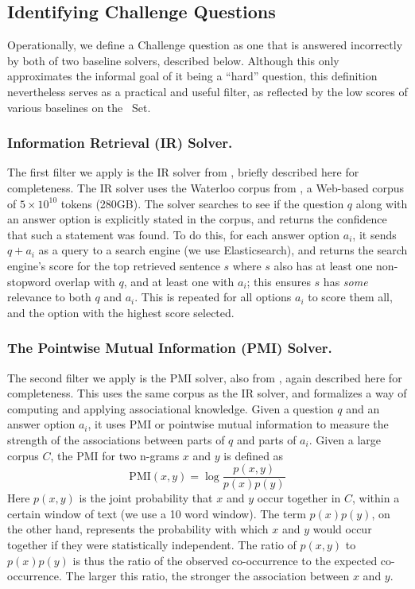 \subsection{Identifying Challenge Questions}

Operationally, we define a Challenge question as
one that is answered incorrectly by both of two baseline solvers, described below.
Although this only approximates the informal goal of it being a ``hard'' question,
this definition nevertheless serves as a practical and useful filter, as reflected
by the low scores of various baselines on the \Challenge~Set.

\subsubsection{Information Retrieval (IR) Solver.}
The first filter we apply is the IR solver from \citet{clark2016combining}, briefly described here for completeness. The IR solver uses the Waterloo corpus from \cite{clark2016combining}, a Web-based corpus of $5 \times 10^{10}$ tokens (280GB). The solver searches to see if the question $q$ along with an answer option is explicitly stated in the corpus, and returns the confidence that such a statement was found.
To do this, for each answer option $a_i$, it sends $q + a_i$ as a query to a search engine 
(we use Elasticsearch),
and returns the search engine's score for 
the top retrieved sentence $s$ where $s$ also has at least one non-stopword overlap with $q$, and at least one with $a_i$; this ensures $s$
has {\it some} relevance to both $q$ and $a_i$. This is repeated for all options $a_i$ to score them all, and the option with the highest score selected.

\subsubsection{The Pointwise Mutual Information (PMI) Solver. }
The second filter we apply is the PMI solver, also from \citet{clark2016combining}, again described here for completeness. This uses the same corpus as the IR solver, and
formalizes a way of computing and applying associational knowledge. Given a question $q$ and an answer option $a_i$, it uses PMI or pointwise mutual information \cite{church1989} to measure the strength of the associations between parts of $q$ and parts of $a_i$. Given a large corpus $C$, the PMI for two n-grams $x$ and $y$ is defined as
\begin{equation*}
\mathrm{PMI}(x,y) = \log \frac{p(x,y)}{p(x) p(y)}
\end{equation*}
Here $p(x,y)$ is the joint probability that $x$ and $y$ occur together in $C$, within a certain window of text (we use a 10 word window). The term $p(x) p(y)$, on the other hand, represents the probability with which $x$ and $y$ would occur together if they were statistically independent. The ratio of $p(x,y)$ to $p(x) p(y)$ is thus the ratio of the observed co-occurrence to the expected co-occurrence. The larger this ratio, the stronger the association between $x$ and $y$.

